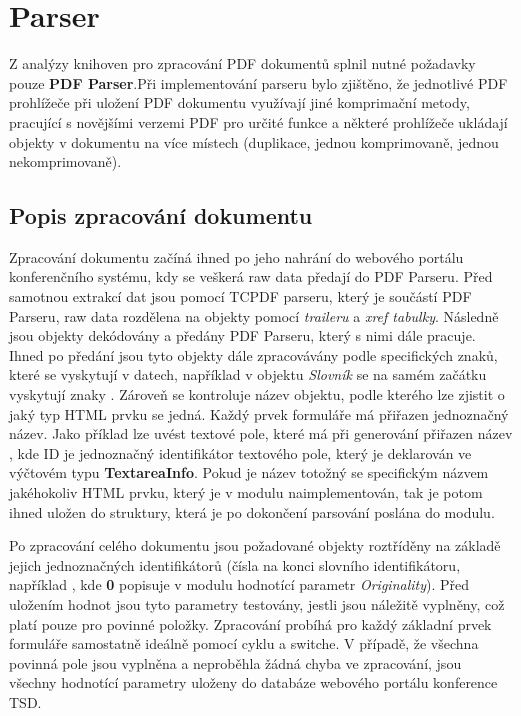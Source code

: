 \section{Parser}
Z analýzy knihoven pro zpracování PDF dokumentů splnil nutné požadavky pouze \textbf{PDF Parser}.Při implementování parseru bylo zjištěno, že jednotlivé PDF prohlížeče při uložení PDF dokumentu využívají jiné komprimační metody, pracující s novějšími verzemi PDF pro určité funkce a některé prohlížeče ukládají objekty v dokumentu na více místech (duplikace, jednou komprimovaně, jednou nekomprimovaně).

\subsection{Popis zpracování dokumentu}
Zpracování dokumentu začíná ihned po jeho nahrání do webového portálu konferenčního systému, kdy se veškerá raw data předají do PDF Parseru. Před samotnou extrakcí dat jsou pomocí TCPDF parseru, který je součástí PDF Parseru, raw data rozdělena na objekty pomocí \textit{traileru} a \textit{xref tabulky}. Následně jsou objekty dekódovány a předány PDF Parseru, který s nimi dále pracuje. Ihned po předání jsou tyto objekty dále zpracovávány podle specifických znaků, které se vyskytují v datech, například v objektu \textit{Slovník} se na samém začátku vyskytují znaky \uv{<<}. Zároveň se kontroluje název objektu, podle kterého lze zjistit o jaký typ HTML prvku se jedná. Každý prvek formuláře má přiřazen jednoznačný název. Jako příklad lze uvést textové pole, které má při generování přiřazen název , kde ID je jednoznačný identifikátor textového pole, který je deklarován ve výčtovém typu \textbf{TextareaInfo}. Pokud je název totožný se specifickým názvem jakéhokoliv HTML prvku, který je v modulu naimplementován, tak je potom ihned uložen do struktury, která je po dokončení parsování poslána do modulu. 
\par
Po zpracování celého dokumentu jsou požadované objekty roztříděny na základě jejich jednoznačných identifikátorů (čísla na konci slovního identifikátoru, například , kde \textbf{0} popisuje v modulu hodnotící parametr \textit{Originality}). Před uložením hodnot jsou tyto parametry testovány, jestli jsou náležitě vyplněny, což platí pouze pro povinné položky. Zpracování probíhá pro každý základní prvek formuláře samostatně ideálně pomocí cyklu a switche. V případě, že všechna povinná pole jsou vyplněna a neproběhla žádná chyba ve zpracování, jsou všechny hodnotící parametry uloženy do databáze webového portálu konference TSD.
